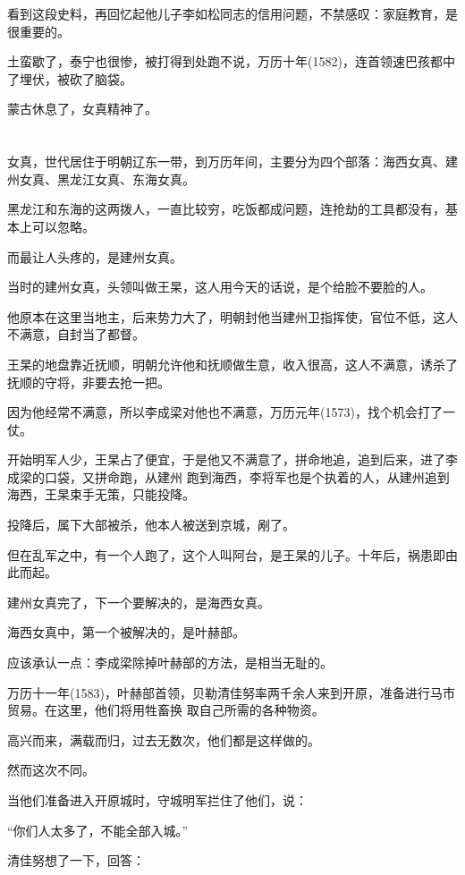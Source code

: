 \documentclass[11pt,a4paper,onecolumn]{article}
\begin{document}
看到这段史料，再回忆起他儿子李如松同志的信用问题，不禁感叹：家庭教育，是很重要的。

土蛮歇了，泰宁也很惨，被打得到处跑不说，万历十年(1582)，连首领速巴孩都中了埋伏，被砍了脑袋。

蒙古休息了，女真精神了。

\section[\thesection]{}

女真，世代居住于明朝辽东一带，到万历年间，主要分为四个部落：海西女真、建州女真、黑龙江女真、东海女真。

黑龙江和东海的这两拨人，一直比较穷，吃饭都成问题，连抢劫的工具都没有，基本上可以忽略。

而最让人头疼的，是建州女真。

当时的建州女真，头领叫做王杲，这人用今天的话说，是个给脸不要脸的人。

他原本在这里当地主，后来势力大了，明朝封他当建州卫指挥使，官位不低，这人不满意，自封当了都督。

王杲的地盘靠近抚顺，明朝允许他和抚顺做生意，收入很高，这人不满意，诱杀了抚顺的守将，非要去抢一把。

因为他经常不满意，所以李成梁对他也不满意，万历元年(1573)，找个机会打了一仗。

开始明军人少，王杲占了便宜，于是他又不满意了，拼命地追，追到后来，进了李成梁的口袋，又拼命跑，从建州
跑到海西，李将军也是个执着的人，从建州追到海西，王杲束手无策，只能投降。

投降后，属下大部被杀，他本人被送到京城，剐了。

但在乱军之中，有一个人跑了，这个人叫阿台，是王杲的儿子。十年后，祸患即由此而起。

建州女真完了，下一个要解决的，是海西女真。

海西女真中，第一个被解决的，是叶赫部。

应该承认一点：李成梁除掉叶赫部的方法，是相当无耻的。

万历十一年(1583)，叶赫部首领，贝勒清佳努率两千余人来到开原，准备进行马市贸易。在这里，他们将用牲畜换
取自己所需的各种物资。

高兴而来，满载而归，过去无数次，他们都是这样做的。

然而这次不同。

当他们准备进入开原城时，守城明军拦住了他们，说：

``你们人太多了，不能全部入城。''

清佳努想了一下，回答：
\end{document}
